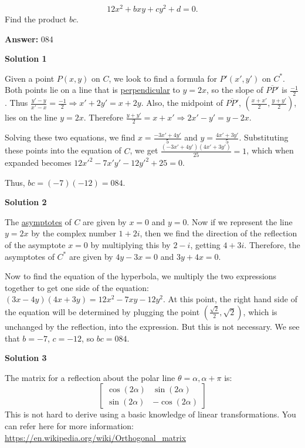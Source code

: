 \begin{enumerate}
 \[12x^2 + bxy + cy^2 + d = 0.\]
Find the product $bc$.


 
 \textbf{Answer: }084



\textbf{Solution 1}

Given a point $P (x,y)$ on $C$, we look to find a formula for $P' (x', y')$ on $C^*$. Both points lie on a line that is \href{https://artofproblemsolving.com/wiki/index.php?title=Perpendicular}{perpendicular} to $y=2x$, so the slope of $\overline{PP'}$ is $\frac{-1}{2}$. Thus $\frac{y' - y}{x' - x} = \frac{-1}{2} \Longrightarrow x' + 2y' = x + 2y$. Also, the midpoint of $\overline{PP'}$, $\left(\frac{x + x'}{2}, \frac{y + y'}{2}\right)$, lies on the line $y = 2x$. Therefore $\frac{y + y'}{2} = x + x' \Longrightarrow 2x' - y' = y - 2x$.

 Solving these two equations, we find $x = \frac{-3x' + 4y'}{5}$ and $y = \frac{4x' + 3y'}{5}$. Substituting these points into the equation of $C$, we get $\frac{(-3x'+4y')(4x'+3y')}{25}=1$, which when expanded becomes $12x'^2-7x'y'-12y'^2+25=0$.

 Thus, $bc=(-7)(-12)=\boxed{084}$.

 



\textbf{Solution 2}

The \href{https://artofproblemsolving.com/wiki/index.php?title=Asymptote}{asymptotes} of $C$ are given by $x=0$ and $y=0$. Now if we represent the line $y=2x$ by the complex number $1+2i$, then we find the direction of the reflection of the asymptote $x=0$ by multiplying this by $2-i$, getting $4+3i$. Therefore, the asymptotes of $C^*$ are given by $4y-3x=0$ and $3y+4x=0$.

 Now to find the equation of the hyperbola, we multiply the two expressions together to get one side of the equation: $(3x-4y)(4x+3y)=12x^2-7xy-12y^2$. At this point, the right hand side of the equation will be determined by plugging the point $(\frac{\sqrt{2}}{2},\sqrt{2})$, which is unchanged by the reflection, into the expression. But this is not necessary. We see that $b=-7$, $c=-12$, so $bc=\boxed{084}$.

 


 



\textbf{Solution 3}

The matrix for a reflection about the polar line $\theta = \alpha, \alpha+\pi$ is:
 \[ \left[ \begin{array}{ccc} \cos(2\alpha) & \sin(2\alpha) \\ \sin(2\alpha) & -\cos(2\alpha) \end{array} \right] \]This is not hard to derive using a basic knowledge of linear transformations. You can refer here for more information: \href{https://en.wikipedia.org/wiki/Orthogonal\_matrix}{https://en.wikipedia.org/wiki/Orthogonal\_matrix}


\end{enumerate}
